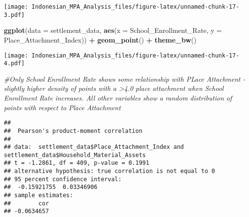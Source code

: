 \documentclass[
]{article}
\newenvironment{Shaded}{\begin{snugshade}}{\end{snugshade}}
\newcommand{\AttributeTok}[1]{\textcolor[rgb]{0.13,0.29,0.53}{#1}}
\newcommand{\CommentTok}[1]{\textcolor[rgb]{0.56,0.35,0.01}{\textit{#1}}}
\newcommand{\FunctionTok}[1]{\textcolor[rgb]{0.13,0.29,0.53}{\textbf{#1}}}
\newcommand{\NormalTok}[1]{#1}
\newcommand{\SpecialCharTok}[1]{\textcolor[rgb]{0.81,0.36,0.00}{\textbf{#1}}}
\begin{document}
\texttt{[image: Indonesian\_MPA\_Analysis\_files/figure-latex/unnamed-chunk-17-3.pdf]}

\begin{Shaded}
\begin{Highlighting}[]
\FunctionTok{ggplot}\NormalTok{(}\AttributeTok{data =}\NormalTok{ settlement\_data, }\FunctionTok{aes}\NormalTok{(}\AttributeTok{x =}\NormalTok{ School\_Enrollment\_Rate, }
                                   \AttributeTok{y =}\NormalTok{ Place\_Attachment\_Index)) }\SpecialCharTok{+}
  \FunctionTok{geom\_point}\NormalTok{() }\SpecialCharTok{+}
  \FunctionTok{theme\_bw}\NormalTok{()}
\end{Highlighting}
\end{Shaded}

\texttt{[image: Indonesian\_MPA\_Analysis\_files/figure-latex/unnamed-chunk-17-4.pdf]}

\begin{Shaded}
\begin{Highlighting}[]
\CommentTok{\#Only School Enrollment Rate shows some relationship with PLace Attachment {-} slightly higher density of points with a \textgreater{}4.0 place attachment when School Enrollment Rate increases. All other variables show a random distribution of points with respect to Place Attachment}
\end{Highlighting}
\end{Shaded}

\begin{Shaded}
\end{Shaded}

\begin{verbatim}
## 
##  Pearson's product-moment correlation
## 
## data:  settlement_data$Place_Attachment_Index and settlement_data$Household_Material_Assets
## t = -1.2861, df = 409, p-value = 0.1991
## alternative hypothesis: true correlation is not equal to 0
## 95 percent confidence interval:
##  -0.15921755  0.03346906
## sample estimates:
##        cor 
## -0.0634657
\end{verbatim}

\begin{Shaded}
\end{Shaded}
\end{document}
